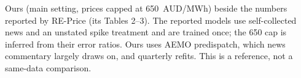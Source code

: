 \providecommand{\materialsdir}{.}
\begin{table}[t]
  \centering
  \caption{Ours (main setting, prices capped at 650~AUD/MWh) beside the
    numbers reported by RE-Price (its Tables 2--3). The reported models use
    self-collected news and an unstated spike treatment and are trained once;
    the 650 cap is inferred from their error ratios. Ours uses AEMO
    predispatch, which news commentary largely draws on, and quarterly refits.
    This is a reference, not a same-data comparison.}
  \label{tab:re-price}
  \small
  
\end{table}
